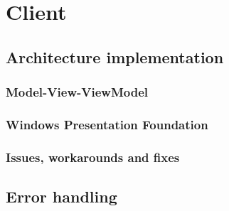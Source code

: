 \section{Client}
\label{Implementation_Client}

\subsection{Architecture implementation}
\label{Implementation_Client_Architecture}

\subsubsection{Model-View-ViewModel}
\label{Implementation_Client_Architecture_MVVM}

\subsubsection{Windows Presentation Foundation}
\label{Implementation_Client_Architecture_WPF}

\subsubsection{Issues, workarounds and fixes}
\label{Implementation_Client_Architecture_Issues}

\subsection{Error handling}
\label{Implementation_Client_Error}